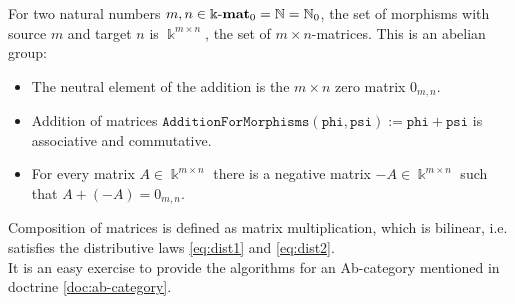 \begin{example}
For two natural numbers $m,n \in {\Bbbk\textnormal{-}\mathbf{mat}}_{0} = \mathbb{N} = \mathbb{N}_{0}$, the set of morphisms with source $m$ and target $n$ is
$\Bbbk^{m\times n}$, the set of $m \times n$-matrices. This is an abelian group:
\begin{itemize}
\item The neutral element of the addition is the $m \times n$ zero matrix $0_{m,n}$.
\item Addition of matrices $\mathtt{AdditionForMorphisms( phi, psi ) := phi + psi}$ is associative and commutative.
\item For every matrix $A \in \Bbbk^{m\times n}$ there is a negative matrix $-A \in \Bbbk^{m \times n}$ such that $A + (-A) = 0_{m,n}$.
\end{itemize}
Composition of matrices is defined as matrix multiplication, which is bilinear, i.e. satisfies the distributive laws \eqref{eq:dist1} and
\eqref{eq:dist2}.\\
It is an easy exercise to provide the algorithms for an Ab-category mentioned in doctrine \ref{doc:ab-category}.
\end{example}

